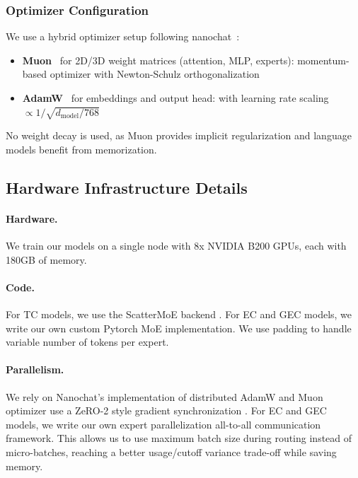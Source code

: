 \documentclass{article}
\theoremstyle{plain}
\theoremstyle{definition}
\theoremstyle{remark}
\begin{document}
\subsubsection{Optimizer Configuration}

We use a hybrid optimizer setup following nanochat~\cite{jordan2024muon, liu2025moonlight}:
\begin{itemize}
    \item \textbf{Muon}~\cite{jordan2024muon} for 2D/3D weight matrices (attention, MLP, experts): momentum-based optimizer with Newton-Schulz orthogonalization
    \item \textbf{AdamW}~\cite{loshchilov2019adamw} for embeddings and output head: with learning rate scaling $\propto 1/\sqrt{d_{\text{model}}/768}$
\end{itemize}

No weight decay is used, as Muon provides implicit regularization and language models benefit from memorization.

\subsection{Hardware Infrastructure Details}

\paragraph{Hardware.} We train our models on a single node with 8x NVIDIA B200 GPUs, each with 180GB of memory. 

\paragraph{Code.} For TC models, we use the ScatterMoE backend \citep{tan2024scattermoe}. For EC and GEC models, we write our own custom Pytorch MoE implementation. We use padding to handle variable number of tokens per expert. 

\paragraph{Parallelism.} We rely on Nanochat's implementation of distributed AdamW and Muon optimizer use a ZeRO-2 style gradient synchronization \citep{rajbhandari2020zero}. For EC and GEC models, we write our own expert parallelization all-to-all communication framework. This allows us to use maximum batch size during routing instead of micro-batches, reaching a better usage/cutoff variance trade-off while saving memory.
\end{document}
